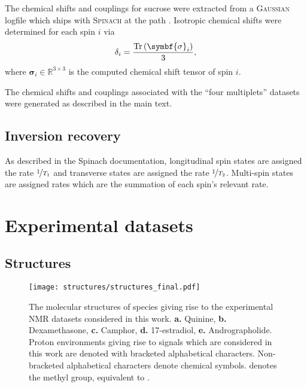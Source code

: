 The chemical shifts and couplings for sucrose were extracted from a
\textsc{Gaussian}\cite{Gaussian03} logfile which ships with \textsc{Spinach} at
the path .
Isotropic chemical shifts were determined for each spin $i$ via
\begin{equation}
    \delta_i = \frac{\Tr \left( \symbf{\sigma}_i \right)}{3},
\end{equation}
where $\symbf{\sigma}_i \in \mathbb{R}^{3 \times 3}$ is the computed chemical
shift tensor of spin $i$.

The chemical shifts and couplings associated with the ``four multiplets''
datasets were generated as described in the main text.

\subsection{Inversion recovery}
As described in the Spinach documentation\cite{SpinachDocs}, longitudinal
spin states are assigned the rate $\nicefrac{1}{T_1}$ and transverse states
are assigned the rate $\nicefrac{1}{T_2}$. Multi-spin states are assigned
rates which are the summation of each spin's relevant rate.




\section{Experimental datasets}

\subsection{Structures}

\begin{figure}[H]
    \centering
    \texttt{[image: structures/structures\_final.pdf]}
    \caption[
        The molecular structures of species giving rise to the experimental
        \acs{NMR} datasets considered in this work.
    ]{
        The molecular structures of species giving rise to the experimental
        \acs{NMR} datasets considered in this work.
        \textbf{a.} Quinine,
        \textbf{b.} Dexamethasone,
        \textbf{c.} Camphor,
        \textbf{d.} 17\textbeta-estradiol,
        \textbf{e.} Andrographolide.
        Proton environments giving rise to signals which are considered in this
        work are denoted with bracketed alphabetical characters. Non-bracketed
        alphabetical characters denote chemical symbols.  denotes the methyl
        group, equivalent to .
    }
    \label{fig:structures}
\end{figure}


